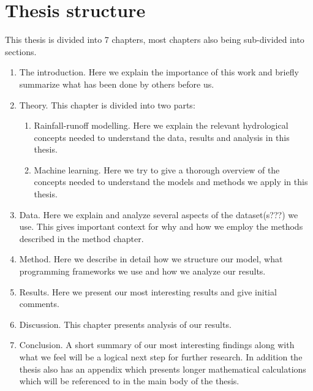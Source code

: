 \section{Thesis structure}
This thesis is divided into 7 chapters, most chapters also being sub-divided into
sections. 
\begin{enumerate}
\item  The introduction. Here we explain the importance of this work and briefly summarize what has been done by others before us.
\item Theory. This chapter is divided into two parts:
    \begin{enumerate}
    \item Rainfall-runoff modelling. Here we explain the relevant hydrological concepts needed to understand the data, results and analysis in this thesis.
    \item Machine learning. Here we try to give a thorough overview of the concepts needed to understand the models and methods we apply in this thesis.
    \end{enumerate}
    \item Data. Here we explain and analyze several aspects of the dataset(s???) \citationneeded  we use. This gives important context for why and how we employ the methods described in the method chapter.
    \item Method. Here we describe in detail how we structure our model, what programming frameworks we use and how we analyze our results.
    \item Results. Here we present our most interesting results and give initial comments.
    \item Discussion. This chapter presents analysis of our results.
    \item Conclusion. A short summary of our most interesting findings along with what we feel will be a logical next step for further research.
In addition the thesis also has an appendix which presents longer mathematical 
calculations which will be referenced to in the main body of the thesis. 

\end{enumerate}
